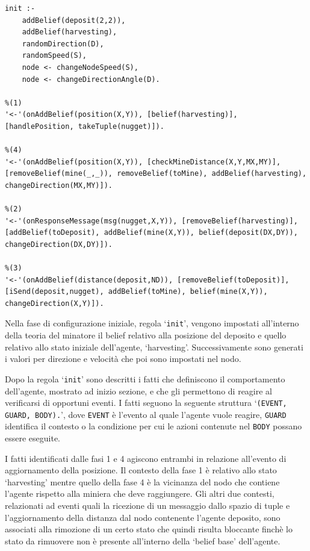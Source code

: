 \switchToProlog{}
\medskip
\begin{lstlisting}[float,firstnumber=1,label={lst:Miner},caption={Teoria minatore}]
init :-
    addBelief(deposit(2,2)),
    addBelief(harvesting),
    randomDirection(D),
    randomSpeed(S),
    node <- changeNodeSpeed(S),
    node <- changeDirectionAngle(D).

%(1)
'<-'(onAddBelief(position(X,Y)), [belief(harvesting)], [handlePosition, takeTuple(nugget)]).

%(4)
'<-'(onAddBelief(position(X,Y)), [checkMineDistance(X,Y,MX,MY)], [removeBelief(mine(_,_)), removeBelief(toMine), addBelief(harvesting), changeDirection(MX,MY)]).

%(2)
'<-'(onResponseMessage(msg(nugget,X,Y)), [removeBelief(harvesting)], [addBelief(toDeposit), addBelief(mine(X,Y)), belief(deposit(DX,DY)), changeDirection(DX,DY)]).

%(3)
'<-'(onAddBelief(distance(deposit,ND)), [removeBelief(toDeposit)], [iSend(deposit,nugget), addBelief(toMine), belief(mine(X,Y)), changeDirection(X,Y)]).
\end{lstlisting}

Nella fase di configurazione iniziale, regola `\texttt{init}', vengono impostati all'interno della teoria del minatore il belief relativo alla posizione del deposito e quello relativo allo stato iniziale dell'agente, `harvesting'. Successivamente sono generati i valori per direzione e velocità che poi sono impostati nel nodo.

Dopo la regola `\texttt{init}' sono descritti i fatti che definiscono il comportamento dell'agente, mostrato ad inizio sezione, e che gli permettono di reagire al verificarsi di opportuni eventi.
I fatti seguono la seguente struttura `\texttt{\leftArrow(EVENT, GUARD, BODY).}', dove \texttt{EVENT} è l'evento al quale l'agente vuole reagire, \texttt{GUARD} identifica il contesto o la condizione per cui le azioni contenute nel \texttt{BODY} possano essere eseguite.

I fatti identificati dalle fasi 1 e 4 agiscono entrambi in relazione all'evento di aggiornamento della posizione. Il contesto della fase 1 è relativo allo stato `harvesting' mentre quello della fase 4 è la vicinanza del nodo che contiene l'agente rispetto alla miniera che deve raggiungere.
Gli altri due contesti, relazionati ad eventi quali la ricezione di un messaggio dallo spazio di tuple e l'aggiornamento della distanza dal nodo contenente l'agente deposito, sono associati alla rimozione di un certo stato che quindi risulta bloccante finchè lo stato da rimuovere non è presente all'interno della `belief base' dell'agente.

